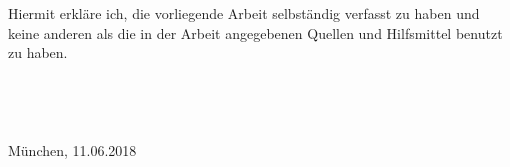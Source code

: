 


Hiermit erkläre ich, die vorliegende Arbeit selbständig verfasst zu haben und keine anderen als die in der Arbeit angegebenen Quellen und Hilfsmittel benutzt zu haben.
\\ \\ \\ \\ \\
München, 11.06.2018
